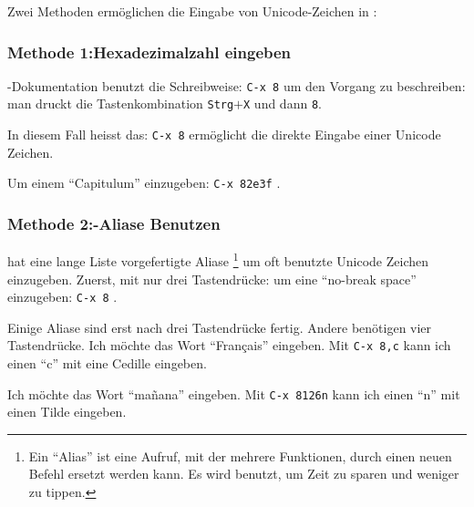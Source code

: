 Zwei Methoden ermöglichen die Eingabe von
Unicode-Zeichen in :

\subsubsection*{Methode 1:\enspace Hexadezimalzahl eingeben}
-Dokumentation benutzt die Schreibweise: %
\texttt{C-x 8}
um den Vorgang zu beschreiben: man druckt die Tastenkombination
\texttt{Strg}$+$\texttt{X} und dann \texttt{8}.

In diesem Fall heisst das: %
\texttt{C-x 8}
ermöglicht die direkte Eingabe einer Unicode Zeichen.

Um einem \enquote{Capitulum} einzugeben: %
\texttt{C-x 8}\texttt{2e3f}
.

\subsubsection*{Methode 2:\enspace {}-Aliase Benutzen}
 hat eine lange Liste vorgefertigte Aliase%
\footnote{Ein \enquote{Alias} ist eine Aufruf, mit der
mehrere Funktionen, durch einen neuen Befehl ersetzt werden kann.
Es wird benutzt, um Zeit zu sparen und weniger zu tippen.}%
um oft benutzte Unicode Zeichen einzugeben. Zuerst, mit nur
drei Tastendrücke: um eine \enquote{no-break space} einzugeben: %
\texttt{C-x 8}
.

Einige Aliase sind erst nach drei Tastendrücke fertig. Andere
benötigen vier Tastendrücke. Ich möchte das Wort \enquote{Français}
eingeben. Mit %
\texttt{C-x 8}\texttt{,c}
kann ich einen \enquote{c} mit eine Cedille eingeben.

Ich möchte das Wort \enquote{mañana} eingeben. Mit %
\texttt{C-x 8}\texttt{\char126n}
kann ich einen \enquote{n} mit einen Tilde eingeben.

